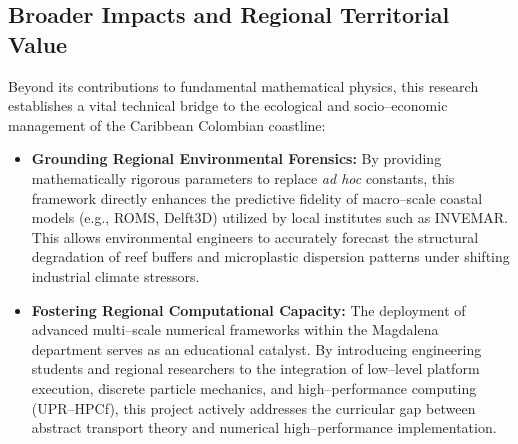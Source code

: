 \subsection{Broader Impacts and Regional Territorial Value}
Beyond its contributions to fundamental mathematical physics, this research establishes a vital technical bridge to the ecological and socio--economic management of the Caribbean Colombian coastline:
\begin{itemize}
    \item \textbf{Grounding Regional Environmental Forensics:} By providing mathematically rigorous parameters to replace \emph{ad hoc} constants, this framework directly enhances the predictive fidelity of macro--scale coastal models (e.g., ROMS, Delft3D) utilized by local institutes such as INVEMAR. This allows environmental engineers to accurately forecast the structural degradation of reef buffers and microplastic dispersion patterns under shifting industrial climate stressors.
    \item \textbf{Fostering Regional Computational Capacity:} The deployment of advanced multi--scale numerical frameworks within the Magdalena department serves as an educational catalyst. By introducing engineering students and regional researchers to the integration of low--level platform execution, discrete particle mechanics, and high--performance computing (UPR--HPCf), this project actively addresses the curricular gap between abstract transport theory and numerical high--performance implementation.

\end{itemize}
